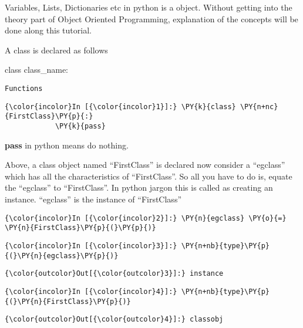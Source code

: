     Variables, Lists, Dictionaries etc in python is a object. Without
getting into the theory part of Object Oriented Programming, explanation
of the concepts will be done along this tutorial.

    A class is declared as follows

    class class\_name:

\begin{verbatim}
Functions
\end{verbatim}

    \begin{Verbatim}[commandchars=\\\{\}]
{\color{incolor}In [{\color{incolor}1}]:} \PY{k}{class} \PY{n+nc}{FirstClass}\PY{p}{:}
            \PY{k}{pass}
\end{Verbatim}

    \textbf{pass} in python means do nothing.

    Above, a class object named ``FirstClass'' is declared now consider a
``egclass'' which has all the characteristics of ``FirstClass''. So all
you have to do is, equate the ``egclass'' to ``FirstClass''. In python
jargon this is called as creating an instance. ``egclass'' is the
instance of ``FirstClass''

    \begin{Verbatim}[commandchars=\\\{\}]
{\color{incolor}In [{\color{incolor}2}]:} \PY{n}{egclass} \PY{o}{=} \PY{n}{FirstClass}\PY{p}{(}\PY{p}{)}
\end{Verbatim}

    \begin{Verbatim}[commandchars=\\\{\}]
{\color{incolor}In [{\color{incolor}3}]:} \PY{n+nb}{type}\PY{p}{(}\PY{n}{egclass}\PY{p}{)}
\end{Verbatim}

            \begin{Verbatim}[commandchars=\\\{\}]
{\color{outcolor}Out[{\color{outcolor}3}]:} instance
\end{Verbatim}
        
    \begin{Verbatim}[commandchars=\\\{\}]
{\color{incolor}In [{\color{incolor}4}]:} \PY{n+nb}{type}\PY{p}{(}\PY{n}{FirstClass}\PY{p}{)}
\end{Verbatim}

            \begin{Verbatim}[commandchars=\\\{\}]
{\color{outcolor}Out[{\color{outcolor}4}]:} classobj
\end{Verbatim}
        
